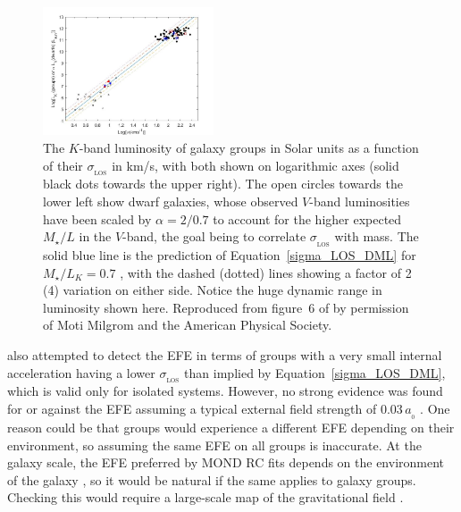 \documentclass[fleqn,usenatbib,useAMS,onecolumn]{mnras} %
\begin{document}
\begin{figure}
	\centering
	\includegraphics[width=0.45\textwidth]{Milgrom_2019_Figure_6_AUTHOR}
	\caption{The $K$-band luminosity of galaxy groups in Solar units as a function of their $\sigma_{_\text{LOS}}$ in km/s, with both shown on logarithmic axes (solid black dots towards the upper right). The open circles towards the lower left show dwarf galaxies, whose observed $V$-band luminosities have been scaled by $\alpha = 2/0.7$ to account for the higher expected $M_{\star}/L$ in the $V$-band, the goal being to correlate $\sigma_{_\text{LOS}}$ with mass. The solid blue line is the prediction of Equation~\ref{sigma_LOS_DML} for $M_{\star}/L_K = 0.7$ \citep{McGaugh_Schombert_2014}, with the dashed (dotted) lines showing a factor of 2 (4) variation on either side. Notice the huge dynamic range in luminosity shown here. Reproduced from figure~6 of \citet{Milgrom_2019} by permission of Moti Milgrom and the American Physical Society.}
	\label{Milgrom_2019_Figure_6_AUTHOR}
\end{figure}

\citet{Milgrom_2019} also attempted to detect the EFE in terms of groups with a very small internal acceleration having a lower $\sigma_{_\text{LOS}}$ than implied by Equation~\ref{sigma_LOS_DML}, which is valid only for isolated systems. However, no strong evidence was found for or against the EFE assuming a typical external field strength of $0.03 \, a_{_0}$ \citep[e.g.][]{Famaey_2007, Banik_Ryan_2018, Haslbauer_2020}. One reason could be that groups would experience a different EFE depending on their environment, so assuming the same EFE on all groups is inaccurate. At the galaxy scale, the EFE preferred by MOND RC fits depends on the environment of the galaxy \citep{Chae_2020_EFE, Chae_2021}, so it would be natural if the same applies to galaxy groups. Checking this would require a large-scale map of the gravitational field \citep[e.g.][]{Desmond_2018}.
\end{document}
